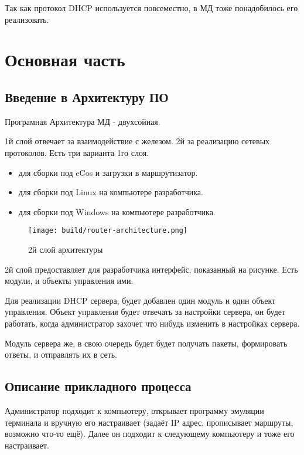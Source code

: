 \documentclass[12pt]{article}
\begin{document}
Так как протокол DHCP используется повсеместно, в МД тоже понадобилось его реализовать.




\pagebreak
\section{Основная часть}

\subsection{Введение в Архитектуру ПО}

Програмная Архитектура МД - двухсойная.

1й слой отвечает за взаимодействие с железом. 2й за реализацию сетевых протоколов.
Есть три варианта 1го слоя.

\begin{itemize}
    \item для сборки под eCos и загрузки в маршрутизатор.
    \item для сборки под Linux на компьютере разработчика.
    \item для сборки под Windows на компьютере разработчика.
\end{itemize}

\begin{figure}[H]
    \texttt{[image: build/router-architecture.png]}
    \caption{2й слой архитектуры}
\end{figure}

2й слой предоставляет для разработчика интерфейс, показанный на рисунке.
Есть модули, и объекты управления ими.

Для реализации DHCP сервера, будет добавлен один модуль и один объект управления.
Объект управления будет отвечать за настройки сервера, он будет работать, когда администратор захочет что нибудь изменить в настройках сервера.

Модуль сервера же, в свою очередь будет будет получать пакеты, формировать ответы, и отправлять их в сеть.

\subsection{Описание прикладного процесса}

Администратор подходит к компьютеру, открывает программу эмуляции терминала и вручную его настраивает
(задаёт IP адрес, прописывает маршруты, возможно что-то ещё).
Далее он подходит к следующему компьютеру и тоже его настраивает.
\end{document}
